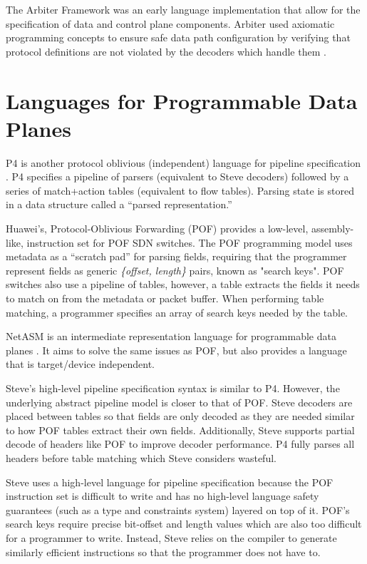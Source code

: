 The Arbiter Framework was an early language implementation that allow for the
specification of data and control plane components. Arbiter used axiomatic 
programming concepts to ensure safe data path configuration by verifying that 
protocol definitions are not violated by the decoders which handle them
\cite{noproto1}.

\section{Languages for Programmable Data Planes} \label{rel:p4}

P4 is another protocol oblivious (independent) language for pipeline specification
 \cite{p4_spec, p4_spec2, p42014}.
P4 specifies a pipeline of parsers (equivalent to Steve decoders) followed
by a series of match+action
tables (equivalent to flow tables). Parsing state is stored in a data structure
called a ``parsed representation.''

Huawei's, Protocol-Oblivious Forwarding (POF) \cite{pof_fis, pof, pof_impl} provides a
low-level, assembly-like, instruction set for POF SDN switches. 
The POF programming model uses metadata as a ``scratch pad'' for parsing fields,
requiring that the programmer represent fields as generic \textit{\{offset, length\}} pairs, 
known as "search keys". POF switches also use a pipeline of tables, however,
a table extracts the fields it needs to match on from the metadata or packet buffer.
When performing table matching, a programmer specifies
an array of search keys needed by the table.

NetASM is an intermediate representation language for programmable data planes
\cite{shahbaz2015netasm}. It aims to solve the same issues as POF, but also provides a language that is target/device independent.

Steve's high-level pipeline specification syntax is similar to P4.
However, the underlying abstract pipeline model is closer to that of POF.
Steve decoders are placed between tables so that fields are only decoded as they are
needed similar to how POF tables extract their own fields.
Additionally, Steve supports partial decode of headers like POF to improve decoder
performance.
P4 fully parses all headers before table matching which Steve considers wasteful.

Steve uses a high-level language for pipeline specification because
the POF instruction set is difficult to write and
has no high-level language safety guarantees (such as a type and constraints system) 
layered on top of it.
POF's search keys require precise bit-offset and length values which are also too
difficult for a programmer to write.
Instead, Steve relies on the compiler to generate similarly efficient instructions
so that the programmer does not have to.


